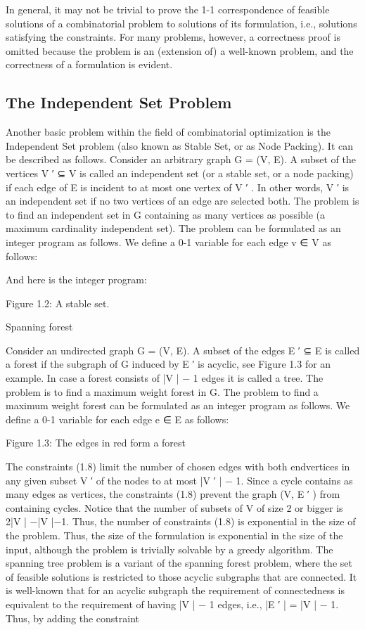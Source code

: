 \documentclass[titlepage]{book}
\begin{document}

In general, it may not be trivial to prove the 1-1 correspondence of feasible solutions of a combinatorial
problem to solutions of its formulation, i.e., solutions satisfying the constraints. For many problems,
however, a correctness proof is omitted because the problem is an (extension of) a well-known problem,
and the correctness of a formulation is evident.

\subsection{The Independent Set Problem}

Another basic problem within the field of combinatorial optimization is the Independent Set problem
(also known as Stable Set, or as Node Packing). It can be described as follows.
Consider an arbitrary graph G = (V, E). A subset of the vertices V ′ ⊆ V is called an independent set
(or a stable set, or a node packing) if each edge of E is incident to at most one vertex of V ′ . In other
words, V ′ is an independent set if no two vertices of an edge are selected both. The problem is to find an
independent set in G containing as many vertices as possible (a maximum cardinality independent set).
The problem can be formulated as an integer program as follows. We define a 0-1 variable for each edge
v ∈ V as follows:

And here is the integer program:


Figure 1.2: A stable set.


Spanning forest

Consider an undirected graph G = (V, E). A subset of the edges E ′ ⊆ E is called a forest if the subgraph
of G induced by E ′ is acyclic, see Figure 1.3 for an example. In case a forest consists of |V | − 1 edges it
is called a tree. The problem is to find a maximum weight forest in G.
The problem to find a maximum weight forest can be formulated as an integer program as follows. We
define a 0-1 variable for each edge e ∈ E as follows:


Figure 1.3: The edges in red form a forest


The constraints (1.8) limit the number of chosen edges with both endvertices in any given subset V ′ of
the nodes to at most |V ′ | − 1. Since a cycle contains as many edges as vertices, the constraints (1.8)
prevent the graph (V, E ′ ) from containing cycles.
Notice that the number of subsets of V of size 2 or bigger is 2|V | −|V |−1. Thus, the number of constraints
(1.8) is exponential in the size of the problem. Thus, the size of the formulation is exponential in the size
of the input, although the problem is trivially solvable by a greedy algorithm.
The spanning tree problem is a variant of the spanning forest problem, where the set of feasible solutions is
restricted to those acyclic subgraphs that are connected. It is well-known that for an acyclic subgraph the
requirement of connectedness is equivalent to the requirement of having |V | − 1 edges, i.e., |E ′ | = |V | − 1.
Thus, by adding the constraint
\end{document}
